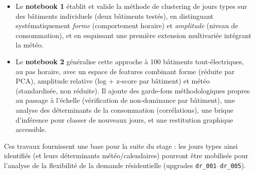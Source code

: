 \documentclass[11pt,a4paper]{article}
\newcommand{\code}[1]{\texttt{#1}}
\begin{document}
\begin{itemize}
    \item Le \textbf{notebook 1} établit et valide la méthode de clustering de jours types sur
    des bâtiments individuels (deux bâtiments testés), en distinguant systématiquement
    \emph{forme} (comportement horaire) et \emph{amplitude} (niveau de consommation), et en
    esquissant une première extension multivariée intégrant la météo.
    \item Le \textbf{notebook 2} généralise cette approche à 100 bâtiments tout-électriques, au
    pas horaire, avec un espace de features combinant forme (réduite par PCA), amplitude
    relative (log + z-score par bâtiment) et météo (standardisée, non réduite). Il ajoute des
    garde-fous méthodologiques propres au passage à l'échelle (vérification de non-dominance
    par bâtiment), une analyse des déterminants de la consommation (corrélations), une brique
    d'inférence pour classer de nouveaux jours, et une restitution graphique accessible.
\end{itemize}

Ces travaux fournissent une base pour la suite du stage : les jours types ainsi identifiés
(et leurs déterminants météo/calendaires) pourront être mobilisés pour l'analyse de la
flexibilité de la demande résidentielle (upgrades \code{dr\_001}--\code{dr\_005}).
\end{document}
